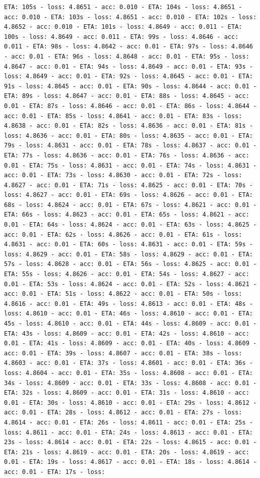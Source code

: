 \documentclass[11pt]{article}
\begin{document}
\begin{Verbatim}[commandchars=\\\{\}]
ETA: 105s - loss: 4.8651 - acc: 0.010 - ETA: 104s - loss: 4.8651 - acc: 0.010 - ETA: 103s - loss: 4.8651 - acc: 0.010 - ETA: 102s - loss: 4.8652 - acc: 0.010 - ETA: 101s - loss: 4.8649 - acc: 0.011 - ETA: 100s - loss: 4.8649 - acc: 0.011 - ETA: 99s - loss: 4.8646 - acc: 0.011 - ETA: 98s - loss: 4.8642 - acc: 0.01 - ETA: 97s - loss: 4.8646 - acc: 0.01 - ETA: 96s - loss: 4.8648 - acc: 0.01 - ETA: 95s - loss: 4.8647 - acc: 0.01 - ETA: 94s - loss: 4.8649 - acc: 0.01 - ETA: 93s - loss: 4.8649 - acc: 0.01 - ETA: 92s - loss: 4.8645 - acc: 0.01 - ETA: 91s - loss: 4.8645 - acc: 0.01 - ETA: 90s - loss: 4.8644 - acc: 0.01 - ETA: 89s - loss: 4.8647 - acc: 0.01 - ETA: 88s - loss: 4.8645 - acc: 0.01 - ETA: 87s - loss: 4.8646 - acc: 0.01 - ETA: 86s - loss: 4.8644 - acc: 0.01 - ETA: 85s - loss: 4.8641 - acc: 0.01 - ETA: 83s - loss: 4.8638 - acc: 0.01 - ETA: 82s - loss: 4.8636 - acc: 0.01 - ETA: 81s - loss: 4.8636 - acc: 0.01 - ETA: 80s - loss: 4.8635 - acc: 0.01 - ETA: 79s - loss: 4.8631 - acc: 0.01 - ETA: 78s - loss: 4.8637 - acc: 0.01 - ETA: 77s - loss: 4.8636 - acc: 0.01 - ETA: 76s - loss: 4.8636 - acc: 0.01 - ETA: 75s - loss: 4.8631 - acc: 0.01 - ETA: 74s - loss: 4.8631 - acc: 0.01 - ETA: 73s - loss: 4.8630 - acc: 0.01 - ETA: 72s - loss: 4.8627 - acc: 0.01 - ETA: 71s - loss: 4.8625 - acc: 0.01 - ETA: 70s - loss: 4.8627 - acc: 0.01 - ETA: 69s - loss: 4.8626 - acc: 0.01 - ETA: 68s - loss: 4.8624 - acc: 0.01 - ETA: 67s - loss: 4.8621 - acc: 0.01 - ETA: 66s - loss: 4.8623 - acc: 0.01 - ETA: 65s - loss: 4.8621 - acc: 0.01 - ETA: 64s - loss: 4.8624 - acc: 0.01 - ETA: 63s - loss: 4.8625 - acc: 0.01 - ETA: 62s - loss: 4.8626 - acc: 0.01 - ETA: 61s - loss: 4.8631 - acc: 0.01 - ETA: 60s - loss: 4.8631 - acc: 0.01 - ETA: 59s - loss: 4.8629 - acc: 0.01 - ETA: 58s - loss: 4.8629 - acc: 0.01 - ETA: 57s - loss: 4.8628 - acc: 0.01 - ETA: 56s - loss: 4.8625 - acc: 0.01 - ETA: 55s - loss: 4.8626 - acc: 0.01 - ETA: 54s - loss: 4.8627 - acc: 0.01 - ETA: 53s - loss: 4.8624 - acc: 0.01 - ETA: 52s - loss: 4.8621 - acc: 0.01 - ETA: 51s - loss: 4.8622 - acc: 0.01 - ETA: 50s - loss: 4.8616 - acc: 0.01 - ETA: 49s - loss: 4.8613 - acc: 0.01 - ETA: 48s - loss: 4.8610 - acc: 0.01 - ETA: 46s - loss: 4.8610 - acc: 0.01 - ETA: 45s - loss: 4.8610 - acc: 0.01 - ETA: 44s - loss: 4.8609 - acc: 0.01 - ETA: 43s - loss: 4.8609 - acc: 0.01 - ETA: 42s - loss: 4.8610 - acc: 0.01 - ETA: 41s - loss: 4.8609 - acc: 0.01 - ETA: 40s - loss: 4.8609 - acc: 0.01 - ETA: 39s - loss: 4.8607 - acc: 0.01 - ETA: 38s - loss: 4.8603 - acc: 0.01 - ETA: 37s - loss: 4.8601 - acc: 0.01 - ETA: 36s - loss: 4.8604 - acc: 0.01 - ETA: 35s - loss: 4.8608 - acc: 0.01 - ETA: 34s - loss: 4.8609 - acc: 0.01 - ETA: 33s - loss: 4.8608 - acc: 0.01 - ETA: 32s - loss: 4.8609 - acc: 0.01 - ETA: 31s - loss: 4.8610 - acc: 0.01 - ETA: 30s - loss: 4.8610 - acc: 0.01 - ETA: 29s - loss: 4.8612 - acc: 0.01 - ETA: 28s - loss: 4.8612 - acc: 0.01 - ETA: 27s - loss: 4.8614 - acc: 0.01 - ETA: 26s - loss: 4.8611 - acc: 0.01 - ETA: 25s - loss: 4.8611 - acc: 0.01 - ETA: 24s - loss: 4.8613 - acc: 0.01 - ETA: 23s - loss: 4.8614 - acc: 0.01 - ETA: 22s - loss: 4.8615 - acc: 0.01 - ETA: 21s - loss: 4.8619 - acc: 0.01 - ETA: 20s - loss: 4.8619 - acc: 0.01 - ETA: 19s - loss: 4.8617 - acc: 0.01 - ETA: 18s - loss: 4.8614 - acc: 0.01 - ETA: 17s - loss: 
\end{Verbatim}
\end{document}
